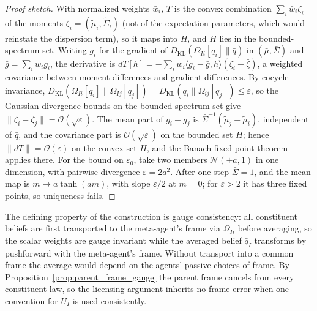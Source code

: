\documentclass[11pt]{article}
\begin{document}
\begin{proof}[Proof sketch]
With normalized weights $\bar{w}_i$, $T$ is the convex combination $\sum_i \bar{w}_i \zeta_i$ of the moments $\zeta_i = (\tilde{\mu}_i, \tilde{\Sigma}_i)$ (not of the expectation parameters, which would reinstate the dispersion term), so it maps into $H$, and $H$ lies in the bounded-spectrum set. Writing $g_i$ for the gradient of $D_{\mathrm{KL}}(\Omega_{Ii}[q_i] \| \bar{q})$ in $(\bar{\mu}, \bar{\Sigma})$ and $\bar{g} = \sum_i \bar{w}_i g_i$, the derivative is $dT[h] = -\sum_i \bar{w}_i \langle g_i - \bar{g}, h\rangle (\zeta_i - \bar{\zeta})$, a weighted covariance between moment differences and gradient differences. By cocycle invariance, $D_{\mathrm{KL}}(\Omega_{Ii}[q_i] \| \Omega_{Ij}[q_j]) = D_{\mathrm{KL}}(q_i \| \Omega_{ij}[q_j]) \le \varepsilon$, so the Gaussian divergence bounds on the bounded-spectrum set give $\|\zeta_i - \zeta_j\| = \mathcal{O}(\sqrt{\varepsilon})$. The mean part of $g_i - g_j$ is $\bar{\Sigma}^{-1}(\tilde{\mu}_j - \tilde{\mu}_i)$, independent of $\bar{q}$, and the covariance part is $\mathcal{O}(\sqrt{\varepsilon})$ on the bounded set $H$; hence $\|dT\| = \mathcal{O}(\varepsilon)$ on the convex set $H$, and the Banach fixed-point theorem applies there. For the bound on $\varepsilon_0$, take two members $\mathcal{N}(\pm a, 1)$ in one dimension, with pairwise divergence $\varepsilon = 2a^2$. After one step $\bar{\Sigma} = 1$, and the mean map is $m \mapsto a\tanh(am)$, with slope $\varepsilon/2$ at $m = 0$; for $\varepsilon > 2$ it has three fixed points, so uniqueness fails.
\end{proof}

The defining property of the construction is gauge consistency: all constituent beliefs are first transported to the meta-agent's frame via $\Omega_{Ii}$ before averaging, so the scalar weights are gauge invariant while the averaged belief $\bar{q}_I$ transforms by pushforward with the meta-agent's frame. Without transport into a common frame the average would depend on the agents' passive choices of frame. By Proposition~\ref{prop:parent_frame_gauge} the parent frame cancels from every constituent law, so the licensing argument inherits no frame error when one convention for $U_I$ is used consistently.
\end{document}

